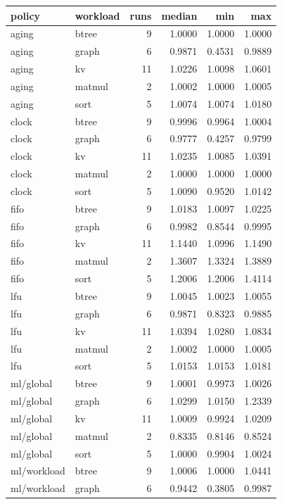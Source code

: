 \documentclass[10pt,a4paper]{article}
\begin{document}
{\footnotesize\setlength{\tabcolsep}{4pt}
\begin{longtable}{llrrrr}
\toprule
\textbf{policy} & \textbf{workload} & \textbf{runs} & \textbf{median} & \textbf{min} & \textbf{max} \\ \midrule
\endhead
aging & btree & 9 & 1.0000 & 1.0000 & 1.0000 \\
aging & graph & 6 & 0.9871 & 0.4531 & 0.9889 \\
aging & kv & 11 & 1.0226 & 1.0098 & 1.0601 \\
aging & matmul & 2 & 1.0002 & 1.0000 & 1.0005 \\
aging & sort & 5 & 1.0074 & 1.0074 & 1.0180 \\
clock & btree & 9 & 0.9996 & 0.9964 & 1.0004 \\
clock & graph & 6 & 0.9777 & 0.4257 & 0.9799 \\
clock & kv & 11 & 1.0235 & 1.0085 & 1.0391 \\
clock & matmul & 2 & 1.0000 & 1.0000 & 1.0000 \\
clock & sort & 5 & 1.0090 & 0.9520 & 1.0142 \\
fifo & btree & 9 & 1.0183 & 1.0097 & 1.0225 \\
fifo & graph & 6 & 0.9982 & 0.8544 & 0.9995 \\
fifo & kv & 11 & 1.1440 & 1.0996 & 1.1490 \\
fifo & matmul & 2 & 1.3607 & 1.3324 & 1.3889 \\
fifo & sort & 5 & 1.2006 & 1.2006 & 1.4114 \\
lfu & btree & 9 & 1.0045 & 1.0023 & 1.0055 \\
lfu & graph & 6 & 0.9871 & 0.8323 & 0.9885 \\
lfu & kv & 11 & 1.0394 & 1.0280 & 1.0834 \\
lfu & matmul & 2 & 1.0002 & 1.0000 & 1.0005 \\
lfu & sort & 5 & 1.0153 & 1.0153 & 1.0181 \\
ml/global & btree & 9 & 1.0001 & 0.9973 & 1.0026 \\
ml/global & graph & 6 & 1.0299 & 1.0150 & 1.2339 \\
ml/global & kv & 11 & 1.0009 & 0.9924 & 1.0209 \\
ml/global & matmul & 2 & 0.8335 & 0.8146 & 0.8524 \\
ml/global & sort & 5 & 1.0000 & 0.9904 & 1.0024 \\
ml/workload & btree & 9 & 1.0006 & 1.0000 & 1.0441 \\
ml/workload & graph & 6 & 0.9442 & 0.3805 & 0.9987 \\

\end{longtable}}
\end{document}
